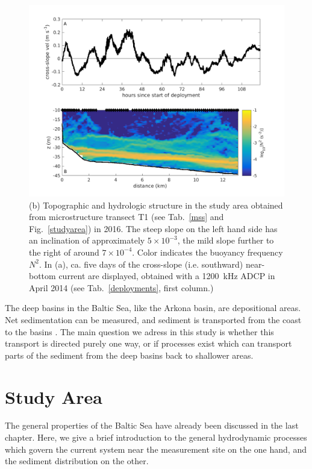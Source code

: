  \begin{figure}[ht]
\includegraphics[width=40pc]{bilder/abslope.png}
 \caption{(b) Topographic and hydrologic structure in the study area 
obtained from microstructure transect T1 (see Tab.\ \ref{mss} and Fig.\ 
\ref{studyarea}) in 2016. The steep slope on the left hand side has an 
inclination of approximately $5 \times 10^{-3}$, the mild slope further to the 
right of around $7 \times 10^{-4}$. Color indicates the buoyancy frequency 
$N^2$. In (a), ca. five days of the cross-slope (i.e. southward) near-bottom 
current are displayed, obtained with a 1200~kHz ADCP in April 2014 (see Tab.\ 
\ref{deployments}, first column.)}
 \label{abslope}
 \end{figure}
 
 The deep basins in the Baltic Sea, like the Arkona basin, are depositional 
areas. Net sedimentation can be measured, and sediment is transported from the 
coast to the basins \citep[][]{basys1, basys2}. The main question we adress in 
this study is whether this transport is directed purely one way, or if processes 
exist which can transport parts of the sediment from the deep basins back to 
shallower areas.

\section{Study Area}

The general properties of the Baltic Sea have already been discussed in the 
last chapter. Here, we give a brief introduction to the general hydrodynamic 
processes which govern the current system near the measurement site on the one 
hand, and the sediment distribution on the other.

